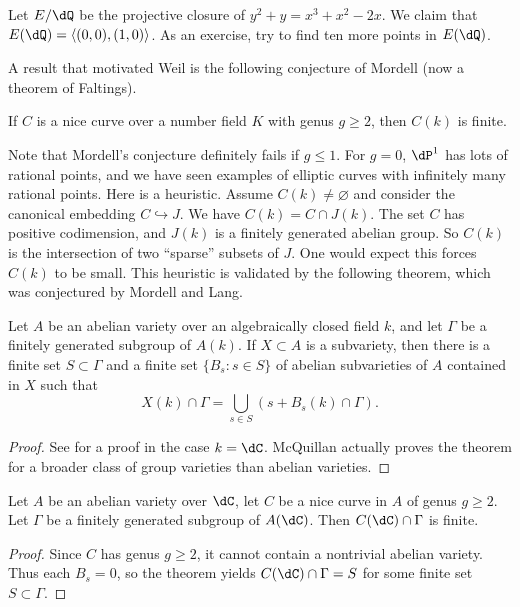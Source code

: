 \begin{example}
Let $E/\dQ$ be the projective closure of $y^2+y = x^3+x^2 - 2 x$. We claim 
that $E(\dQ) = \langle (0,0),(1,0)\rangle$. As an exercise, try to find ten 
more points in $E(\dQ)$. 
\end{example}

A result that motivated Weil is the following conjecture of Mordell (now a 
theorem of Faltings). 

\begin{theorem}[Faltings]
If $C$ is a nice curve over a number field $K$ with genus $g\geqslant 2$, then 
$C(k)$ is finite.
\end{theorem}

Note that Mordell's conjecture definitely fails if $g\leqslant 1$. For $g=0$, 
$\dP^1$ has lots of rational points, and we have seen examples of 
elliptic curves with infinitely many rational points. Here is a heuristic. 
Assume $C(k)\ne\varnothing$ and consider the canonical embedding 
$C\hookrightarrow J$. We have $C(k)=C\cap J(k)$. The set $C$ has positive 
codimension, and $J(k)$ is a finitely generated abelian group. So 
$C(k)$ is the intersection of two ``sparse'' subsets of $J$. One would expect 
this forces $C(k)$ to be small. This heuristic is validated by the following 
theorem, which was conjectured by Mordell and Lang.

\begin{theorem}[Faltings]
Let $A$ be an abelian variety over an algebraically closed field $k$, and let 
$\Gamma$ be a finitely generated subgroup of $A(k)$. If $X\subset A$ is a 
subvariety, then there is a finite set $S\subset \Gamma$ and a finite set 
$\{B_s:s\in S\}$ of abelian subvarieties of $A$ contained in $X$ such that 
\[
  X(k)\cap \Gamma = \bigcup_{s\in S} \left(s+ B_s(k)\cap \Gamma\right) \text{.}
\]
\end{theorem}
\begin{proof}
See \cite{mc95} for a proof in the case $k=\dC$. McQuillan actually proves the 
theorem for a broader class of group varieties than abelian varieties. 
\end{proof}

\begin{corollary}
Let $A$ be an abelian variety over $\dC$, let $C$ be a nice curve in $A$ of 
genus $g\geqslant 2$. Let $\Gamma$ be a finitely generated subgroup of 
$A(\dC)$. Then $C(\dC)\cap \Gamma$ is finite. 
\end{corollary}
\begin{proof}
Since $C$ has genus $g\geqslant 2$, it cannot contain a nontrivial abelian 
variety. Thus each $B_s = 0$, so the theorem yields $C(\dC)\cap \Gamma = S$ 
for some finite set $S\subset \Gamma$. 
\end{proof}

